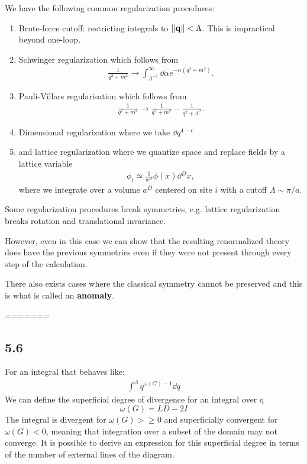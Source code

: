 We have the following common regularization procedures:
\begin{enumerate}[label=\alph*)]
    \item Brute-force cutoff: restricting integrals to $\left\|\vb{q}\right\| < \Lambda$. This is impractical beyond one-loop.
    \item Schwinger regularization which follows from
        \begin{align*}
            \frac{1}{q^2 + m^2} \to \int_{\Lambda^{-2}}^{\infty} \dd{\alpha} e^{-\alpha \left( q^2 + m^2 \right) }
        .\end{align*}
    \item Pauli-Villars regularisation which follows from
        \begin{align*}
            \frac{1}{q^2 + m^2} \to \frac{1}{q^2 + m^2 } - \frac{1}{q^2 + \Lambda^2}
        .\end{align*}
    \item Dimensional regularization where we take $\dd{q}^{4- \epsilon}$
    \item and lattice regularization where we quantize space and replace fields by a lattice variable
        \begin{align*}
            \phi_i \simeq \frac{1}{a^{D}} \phi \left( x \right) \dd{^{D}x}
        ,\end{align*}
        where we integrate over a volume $a^{D}$ centered on site $i$ with a cutoff $\Lambda \sim  \pi/a$.
\end{enumerate}

Some regularization procedures break symmetries, e.g. lattice regularization breaks rotation and translational invariance.

However, even in this case we can show that the resulting renormalized theory does have the previous symmetries even if they were not present through every step of the calculation.

There also exists cases where the classical symmetry cannot be preserved and this is what is called an \textbf{anomaly}.





=======

\subsection{5.6}
For an integral that behaves like:
\begin{align*}
    \int^{\Lambda}q^{\omega(G)-1}\dd q
\end{align*}
We can define the superficial degree of divergence for an integral over q %
\begin{equation*}
    \omega(G)=LD-2I
\end{equation*}
The integral is divergent for $\omega(G)>\geq0$ and superficially convergent for $\omega(G)<0$, meaning that integration over a subset of the domain may not converge.
It is possible to derive an expression for this superficial degree in terms of the number of external lines of the diagram.
\\

